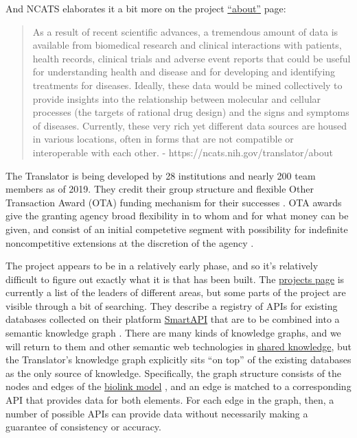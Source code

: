 \documentclass[10pt]{article}
\begin{document}
\begin{multicols}{2}
And NCATS elaborates it a bit more on the project
\href{https://ncats.nih.gov/translator/about}{``about''} page:

\begin{quote}
As a result of recent scientific advances, a tremendous amount of data
is available from biomedical research and clinical interactions with
patients, health records, clinical trials and adverse event reports that
could be useful for understanding health and disease and for developing
and identifying treatments for diseases. Ideally, these data would be
mined collectively to provide insights into the relationship between
molecular and cellular processes (the targets of rational drug design)
and the signs and symptoms of diseases. Currently, these very rich yet
different data sources are housed in various locations, often in forms
that are not compatible or interoperable with each other. -
https://ncats.nih.gov/translator/about
\end{quote}

The Translator is being developed by 28 institutions and nearly 200 team
members as of 2019. They credit their group structure and flexible Other
Transaction Award (OTA) funding mechanism for their successes \cite{consortiumBiomedicalDataTranslator2019} . OTA awards give the
granting agency broad flexibility in to whom and for what money can be
given, and consist of an initial competetive segment with possibility
for indefinite noncompetitive extensions at the discretion of the agency
\cite{fleisherOtherTransactionAward2019} .

The project appears to be in a relatively early phase, and so it's
relatively difficult to figure out exactly what it is that has been
built. The
\href{https://web.archive.org/web/20210710012427/https://ncats.nih.gov/translator/projects}{projects
page} is currently a list of the leaders of different areas, but some
parts of the project are visible through a bit of searching. They
describe a registry of APIs for existing databases collected on their
platform \href{https://smart-api.info/portal/translator}{SmartAPI} that
are to be combined into a semantic knowledge graph \cite{consortiumUniversalBiomedicalData2019} . There are many kinds of
knowledge graphs, and we will return to them and other semantic web
technologies in \protect\hyperlink{shared-knowledge}{shared knowledge},
but the Translator's knowledge graph explicitly sits ``on top'' of the
existing databases as the only source of knowledge. Specifically, the
graph structure consists of the nodes and edges of the
\href{https://github.com/biolink/biolink-model}{biolink model} \cite{bruskiewichBiolinkBiolinkmodel2021} , and an edge is matched to a
corresponding API that provides data for both elements. For each edge in
the graph, then, a number of possible APIs can provide data without
necessarily making a guarantee of consistency or accuracy.


\end{multicols}
\end{document}
